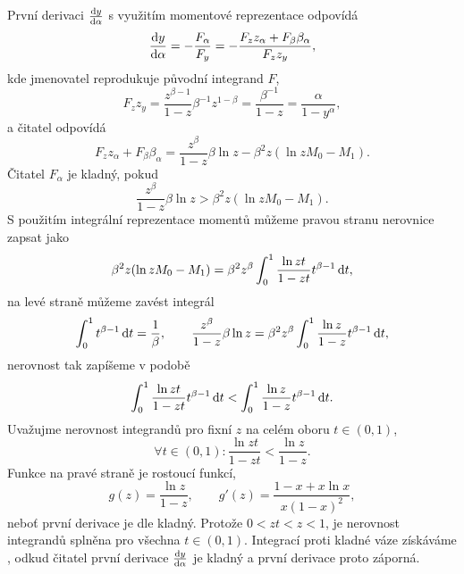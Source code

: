 První derivaci $\frac{\mathrm{d} y}{\mathrm{d} \alpha}$ s využitím momentové reprezentace odpovídá
\begin{equation}
    \frac{\mathrm{d} y}{\mathrm{d} \alpha}=-\frac{F_\alpha}{F_y}=-\frac{F_z z_\alpha+F_\beta \beta_\alpha}{F_z z_y},
\end{equation}
kde jmenovatel reprodukuje původní integrand $F$,
\begin{equation}
    F_z z_y = \frac{z^{\beta-1}}{1-z} \beta^{-1}z^{1-\beta}=\frac{\beta^{-1}}{1-z}=\frac{\alpha}{1-y^{\alpha}},
\end{equation}
a čitatel odpovídá
\begin{equation}
    F_z z_\alpha+F_\beta \beta_\alpha = \frac{z^\beta}{1-z}\beta\ln z-\beta^2 z(\ln{z}M_0-M_1).
\end{equation}
Čitatel $F_\alpha$ je kladný, pokud
\begin{equation}
    \frac{z^\beta}{1-z}\beta\ln z>\beta^2 z(\ln{z}M_0-M_1).
\end{equation}
S použitím integrální reprezentace momentů můžeme pravou stranu nerovnice zapsat jako
\begin{equation}
     \beta^2 z(\ln{z}M_0-M_1)=\beta^2 z^\beta \int_0^1\frac{\ln{zt}}{1-zt} t^{\beta-1}\,\mathrm{d}{t},
\end{equation}
na levé straně můžeme zavést integrál
\begin{equation}
    \int_0^1 t^{\beta-1}\,\mathrm{d}{t} = \frac{1}{\beta},\qquad \frac{z^\beta}{1-z}\beta \ln z = \beta^2 z^\beta \int_0^1\frac{\ln{z}}{1-z}t^{\beta-1}\,\mathrm{d}{t},
\end{equation}
nerovnost tak zapíšeme v podobě 
\begin{equation}\label{eq:moment_first_derivative_modified_integral_inequality}
    \int_0^1\frac{\ln{zt}}{1-zt}t^{\beta-1}\,\mathrm{d}{t}<\int_0^1\frac{\ln{z}}{1-z}t^{\beta-1}\,\mathrm{d}{t}.
\end{equation}
Uvažujme nerovnost integrandů pro fixní $z$ na celém oboru $t\in(0,1)$,
\begin{equation}
\forall t\in(0,1): \frac{\ln{zt}}{1-zt}<\frac{\ln{z}}{1-z}.
\end{equation}
Funkce na pravé straně je rostoucí funkcí,
\begin{equation}
    g(z)=\frac{\ln{z}}{1-z},\qquad g'(z)=\frac{1-x+x\ln{x}}{x(1-x)^2},
\end{equation} 
neboť první derivace je dle  kladný. Protože $0<zt<z<1$, je nerovnost integrandů splněna pro všechna $t\in(0,1)$. Integrací proti kladné váze získáváme , odkud čitatel první derivace $\frac{\mathrm{d} y}{\mathrm{d} \alpha}$ je kladný a první derivace proto záporná.

